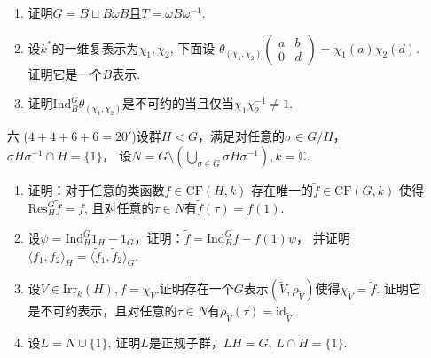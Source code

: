 \begin{enumerate}
\begin{enumerate}
    \item 证明$G=B\sqcup B\omega B$且$T=\omega B\omega^{-1}.$
    \item 设$k^*$的一维复表示为$\chi_1,\chi_2$, 下面设
    $\theta_{(\chi_1,\chi_2)}\begin{pmatrix}
        a&b\\0&d
    \end{pmatrix}=\chi_1(a)\chi_2(d).$
    证明它是一个$B$表示.
    \item 证明$\text{Ind}_B^G\theta_{(\chi_1,\chi_2)}$是不可约的当且仅当$\chi_1\chi_2^{-1}\neq 1.$ 
\end{enumerate}
\item[六] ($4+4+6+6=20'$)设群$H<G$，满足对任意的$\sigma\in G/H$，$\sigma H\sigma^{-1}\cap H=\{1\}$，
设$N=G\setminus\left(\bigcup_{\sigma \in G}\sigma H\sigma^{-1}\right),k=\mathbb{C}.$
\begin{enumerate}
    \item 证明：对于任意的类函数$f\in \text{CF}(H,k)$ 存在唯一的$\tilde{f} \in \text{CF}(G,k)$
    使得$\text{Res}_H^G\tilde{f}=f$, 且对任意的$\tau\in N$有$\tilde{f}(\tau)=f(1)$.
    \item 设$\psi=\text{Ind}_H^G1_H-1_G$，证明：$\tilde{f}=\text{Ind}_H^Gf-f(1)\psi$，
    并证明$\langle f_1,f_2\rangle_H=\langle \tilde{f}_1,\tilde{f}_2\rangle_G.$
    \item 设$V\in\text{Irr}_k(H), f=\chi_V.$证明存在一个$G$表示$(\tilde{V},\rho_{\tilde{V}})$使得$\chi_{\tilde{V}}=\tilde{f}$. 
    证明它是不可约表示，且对任意的$\tau\in N$有$\rho_{\tilde{V}}(\tau)=\text{id}_{\tilde{V}}.$
    \item 设$L=N\cup\{1\}$, 证明$L$是正规子群，$LH=G$, $L\cap H=\{1\}.$
\end{enumerate}
\end{enumerate}